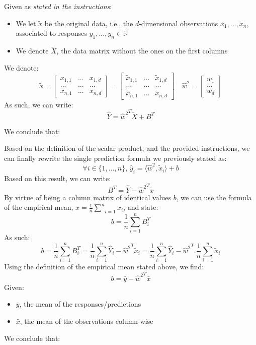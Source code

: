 \documentclass{homework}
\begin{document}
Given as \textit{stated in the instructions}:
\begin{itemize}
    \item We let $\tilde{x}$ be the original data, i.e., the $d$-dimensional observations $x_1, ..., x_n$, 
    associated to responses $y_1,...,y_n\in\mathbb{R}$
    \item We denote $\tilde{X}$, the data matrix without the ones on the first columns
\end{itemize}
We denote:
$$\tilde{x}=\begin{bmatrix}
x_{1,1} & ... & x_{1, d}\\
... & ... & ... \\
x_{n,1} & ... & x_{n, d}
\end{bmatrix}=\begin{bmatrix}
\tilde{x}_{1,1} & ... & \tilde{x}_{1, d}\\
... & ... & ... \\
\tilde{x}_{n,1} & ... & \tilde{x}_{n, d}
\end{bmatrix}\quad\hat{w}^2=\begin{bmatrix}
w_1\\
...\\
w_d
\end{bmatrix}$$
As such, we can write:
$$\hat{Y}={\hat{w}^2}^T\tilde{X}+B^T$$

We conclude that:

\textcolor{OliveGreen}{Based on the definition of the scalar product, and the provided instructions, we can finally rewrite the single 
prediction formula we previously stated as:
$$\forall i\in\{1,...,n\},\,\hat{y}_i=\langle\hat{w}^2,\tilde{x}_i\rangle+b$$}
Based on this result, we can write:
$$B^T=\hat{Y}-{\hat{w}^2}^T\tilde{x}$$
By virtue of being a column matrix of identical values $b$, we can use the formula of the empirical mean,
$\bar{x}=\frac{1}{n}\underset{i=1}{\overset{n}{\sum}}x_i$, and state:
$$b=\frac{1}{n}\underset{i=1}{\overset{n}{\sum}}B^T_i$$
As such:
$$b=\frac{1}{n}\underset{i=1}{\overset{n}{\sum}}B^T_i=\frac{1}{n}\underset{i=1}{\overset{n}{\sum}}\hat{Y}_i-{\hat{w}^2}^T\tilde{x}_i=
\frac{1}{n}\underset{i=1}{\overset{n}{\sum}}\hat{Y}_i-{\hat{w}^2}^T.\frac{1}{n}\underset{i=1}{\overset{n}{\sum}}\tilde{x}_i$$
Using the definition of the empirical mean stated above, we find:
$$b=\bar{y}-{\hat{w}^2}^T\bar{x}$$
Given:
\begin{itemize}
    \item $\bar{y}$, the mean of the responses/predictions
    \item $\bar{x}$, the mean of the observations column-wise
\end{itemize}
We conclude that: 
\end{document}
